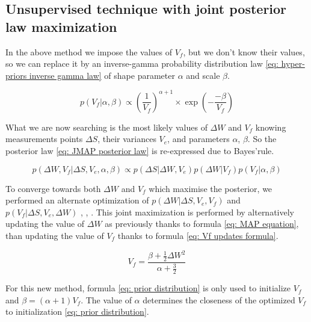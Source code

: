\subsection{\texorpdfstring{Unsupervised technique with joint posterior law maximization}{Unsupervised technique with joint posterior law  maximization}\label{sec: JMAP}}


In the above method we impose the values of $V_{f}$, but we don't know their values, so we can replace it by an inverse-gamma probability distribution  law \eqref{eq: hyper-priors inverse gamma law} of shape parameter $\alpha$ and scale $\beta$.

\begin{equation}
p\left(V_{f}|\alpha, \beta \right) \propto \left(\frac{1}{V_{f}}\right)^{\alpha+1}\times\exp\left(-\frac{-\beta}{V_{f}}\right) \label{eq: hyper-priors inverse gamma law}
\end{equation}

What we are now searching is the most likely values of $\Delta W$ and $V_{f}$ knowing measurements points $\Delta S$, their variances $V_{e}$, and parameters $\alpha$, $\beta$. So the posterior law \eqref{eq: JMAP posterior law} is re-expressed due to Bayes'rule.

\begin{equation}
p\left(\Delta W, V_{f} |\Delta S , V_{e}, \alpha, \beta \right) \propto p\left(\Delta S | \Delta W, V_{e} \right)p\left(\Delta W | V_{f} \right)p\left(V_{f} | \alpha, \beta\right) \label{eq: JMAP posterior law}
\end{equation}

To converge towards both $\Delta W$ and $V_{f}$ which maximise the posterior, we performed an alternate optimization of $p\left(\Delta W |\Delta S , V_{e}, V_{f} \right)$ and $p\left(V_{f} |\Delta S , V_{e},\Delta W  \right)$ \cite{mohammad2015bayesian}, \cite{ayasso2010joint}, \cite{zhao2016joint}. This joint maximization is performed by alternatively updating the value of $\Delta W$ as previously thanks to formula \eqref{eq: MAP equation}, than updating the value of $V_{f}$ thanks to formula \eqref{eq: Vf updates formula}.

\begin{equation}
V_{f} = \frac{\beta+\frac{1}{2}\Delta W^{2}}{\alpha+\frac{3}{2}} \label{eq: Vf updates formula}
\end{equation}

For this new method, formula \eqref{eq: prior distribution} is only used to initialize $V_{f}$ and $\beta = \left(\alpha+1\right)V_{f}$. The value of $\alpha$ determines the closeness of the optimized $V_{f}$ to initialization \eqref{eq: prior distribution}.

